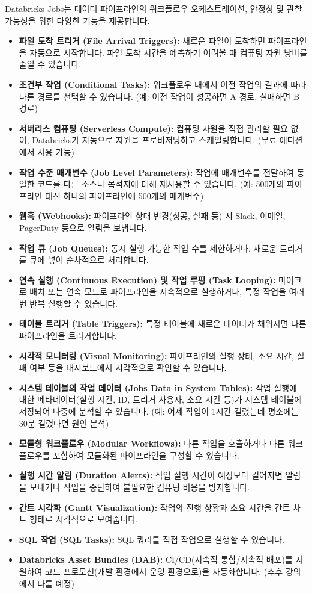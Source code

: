 \documentclass[11pt,a4paper]{article}
\begin{document}
Databricks Jobs는 데이터 파이프라인의 워크플로우 오케스트레이션, 안정성 및 관찰 가능성을 위한 다양한 기능을 제공합니다.

\begin{itemize}
    \item \textbf{파일 도착 트리거 (File Arrival Triggers):} 새로운 파일이 도착하면 파이프라인을 자동으로 시작합니다. 파일 도착 시간을 예측하기 어려울 때 컴퓨팅 자원 낭비를 줄일 수 있습니다.
    \item \textbf{조건부 작업 (Conditional Tasks):} 워크플로우 내에서 이전 작업의 결과에 따라 다른 경로를 선택할 수 있습니다. (예: 이전 작업이 성공하면 A 경로, 실패하면 B 경로)
    \item \textbf{서버리스 컴퓨팅 (Serverless Compute):} 컴퓨팅 자원을 직접 관리할 필요 없이, Databricks가 자동으로 자원을 프로비저닝하고 스케일링합니다. (무료 에디션에서 사용 가능)
    \item \textbf{작업 수준 매개변수 (Job Level Parameters):} 작업에 매개변수를 전달하여 동일한 코드를 다른 소스나 목적지에 대해 재사용할 수 있습니다. (예: 500개의 파이프라인 대신 하나의 파이프라인에 500개의 매개변수)
    \item \textbf{웹훅 (Webhooks):} 파이프라인 상태 변경(성공, 실패 등) 시 Slack, 이메일, PagerDuty 등으로 알림을 보냅니다.
    \item \textbf{작업 큐 (Job Queues):} 동시 실행 가능한 작업 수를 제한하거나, 새로운 트리거를 큐에 넣어 순차적으로 처리합니다.
    \item \textbf{연속 실행 (Continuous Execution) 및 작업 루핑 (Task Looping):} 마이크로 배치 또는 연속 모드로 파이프라인을 지속적으로 실행하거나, 특정 작업을 여러 번 반복 실행할 수 있습니다.
    \item \textbf{테이블 트리거 (Table Triggers):} 특정 테이블에 새로운 데이터가 채워지면 다른 파이프라인을 트리거합니다.
    \item \textbf{시각적 모니터링 (Visual Monitoring):} 파이프라인의 실행 상태, 소요 시간, 실패 여부 등을 대시보드에서 시각적으로 확인할 수 있습니다.
    \item \textbf{시스템 테이블의 작업 데이터 (Jobs Data in System Tables):} 작업 실행에 대한 메타데이터(실행 시간, ID, 트리거 사용자, 소요 시간 등)가 시스템 테이블에 저장되어 나중에 분석할 수 있습니다. (예: 어제 작업이 1시간 걸렸는데 평소에는 30분 걸렸다면 원인 분석)
    \item \textbf{모듈형 워크플로우 (Modular Workflows):} 다른 작업을 호출하거나 다른 워크플로우를 포함하여 모듈화된 파이프라인을 구성할 수 있습니다.
    \item \textbf{실행 시간 알림 (Duration Alerts):} 작업 실행 시간이 예상보다 길어지면 알림을 보내거나 작업을 중단하여 불필요한 컴퓨팅 비용을 방지합니다.
    \item \textbf{간트 시각화 (Gantt Visualization):} 작업의 진행 상황과 소요 시간을 간트 차트 형태로 시각적으로 보여줍니다.
    \item \textbf{SQL 작업 (SQL Tasks):} SQL 쿼리를 직접 작업으로 실행할 수 있습니다.
    \item \textbf{Databricks Asset Bundles (DAB):} CI/CD(지속적 통합/지속적 배포)를 지원하여 코드 프로모션(개발 환경에서 운영 환경으로)을 자동화합니다. (추후 강의에서 다룰 예정)
\end{itemize}
\end{document}
